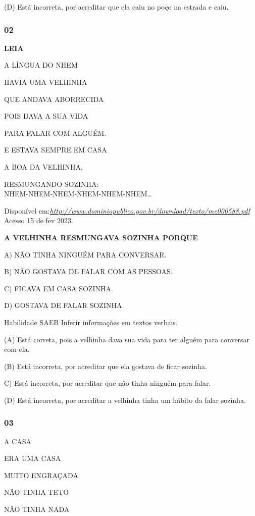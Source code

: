\begin{escola}
(D) Está incorreta, por acreditar que ela caiu no poço na estrada e
caiu.

\subsubsection{02}\label{section-21}

\textbf{LEIA}

A LÍNGUA DO NHEM

HAVIA UMA VELHINHA

QUE ANDAVA ABORRECIDA

POIS DAVA A SUA VIDA

PARA FALAR COM ALGUÉM.

E ESTAVA SEMPRE EM CASA

A BOA DA VELHINHA,

RESMUNGANDO SOZINHA:\\
NHEM-NHEM-NHEM-NHEM-NHEM-NHEM\ldots{}

Disponível
em:\href{http://www.dominiopublico.gov.br/download/texto/me000588.pdf}{\emph{http://www.dominiopublico.gov.br/download/texto/me000588.pdf}}
Acesso 15 de fev 2023.

\textbf{A VELHINHA RESMUNGAVA SOZINHA PORQUE}

A) NÃO TINHA NINGUÉM PARA CONVERSAR.

B) NÃO GOSTAVA DE FALAR COM AS PESSOAS.

C) FICAVA EM CASA SOZINHA.

D) GOSTAVA DE FALAR SOZINHA.

Habilidade SAEB Inferir informações em textos verbais.

(A) Está correta, pois a velhinha dava sua vida para ter alguém para
conversar com ela.

(B) Está incorreta, por acreditar que ela gostava de ficar sozinha.

C) Está incorreta, por acreditar que não tinha ninguém para falar.

(D) Está incorreta, por acreditar a velhinha tinha um hábito da falar
sozinha.

\subsubsection{03}\label{section-22}

A CASA

ERA UMA CASA

MUITO ENGRAÇADA

NÃO TINHA TETO

NÃO TINHA NADA


\end{escola}
